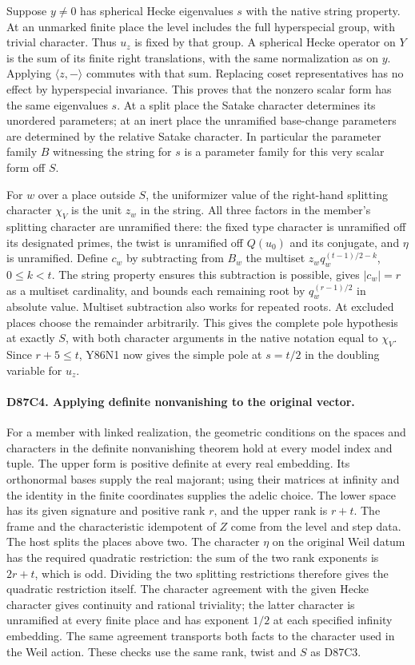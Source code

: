 Suppose $y\ne0$ has spherical Hecke eigenvalues $s$ with the native
string property. At an unmarked finite place the level includes
the full hyperspecial group, with trivial character. Thus $u_z$
is fixed by that group. A spherical Hecke operator on $Y$ is
the sum of its finite right translations, with the same
normalization as on $y$. Applying $\langle z,-\rangle$ commutes
with that sum. Replacing coset representatives has no effect
by hyperspecial invariance. This proves that the nonzero scalar
form has the same eigenvalues $s$. At a split place the Satake
character determines its unordered parameters; at an inert
place the unramified base-change parameters are determined by
the relative Satake character. In particular the parameter
family $B$ witnessing the string for $s$ is a parameter family
for this very scalar form off $S$.

For $w$ over a place outside $S$, the uniformizer value of the
right-hand splitting character $\chi_V$ is the unit $z_w$ in
the string. All three factors in the member's splitting character
are unramified there: the fixed type character is unramified off
its designated primes, the twist is unramified off $Q(u_0)$ and
its conjugate, and $\eta$ is unramified. Define $c_w$ by subtracting
from $B_w$ the multiset $z_w q_w^{(t-1)/2-k}$, $0\le k<t$.
The string property ensures this subtraction is possible, gives
$|c_w|=r$ as a multiset cardinality, and bounds each remaining
root by $q_w^{(r-1)/2}$ in absolute value. Multiset subtraction
also works for repeated roots. At excluded places choose the
remainder arbitrarily. This gives the complete pole hypothesis
at exactly $S$, with both character arguments in the native
notation equal to $\chi_V$. Since $r+5\le t$, Y86N1 now gives
the simple pole at $s=t/2$ in the doubling variable for $u_z$.

\paragraph{D87C4. Applying definite nonvanishing to the original vector.}
For a member with linked realization, the geometric conditions
on the spaces and characters in the definite nonvanishing theorem
hold at every model index and tuple. The upper form is positive
definite at every real embedding. Its orthonormal bases supply
the real majorant; using their matrices at infinity and the identity
in the finite coordinates supplies the adelic choice. The lower
space has its given signature and positive rank $r$, and the upper
rank is $r+t$. The frame and the characteristic idempotent of $Z$
come from the level and step data. The host splits the places above
two. The character $\eta$ on the original Weil datum has the required
quadratic restriction: the sum of the two rank exponents is
$2r+t$, which is odd. Dividing the two splitting restrictions therefore gives the quadratic
restriction itself. The character agreement with the given Hecke
character gives continuity and rational triviality; the latter
character is unramified at every finite place and has exponent
$1/2$ at each specified infinity embedding. The same agreement
transports both facts to the character used in the Weil action. These checks use the same
rank, twist and $S$ as D87C3.

